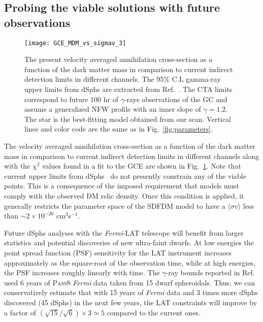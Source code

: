 \subsection{Probing the viable solutions with future observations}
\begin{figure}[t]
\begin{center}
\texttt{[image: GCE\_MDM\_vs\_sigmav\_3]} 
\caption{The present velocity averaged annihilation cross-section as a function of the dark matter mass in comparison to current indirect detection limits in different channels. 
The 95\% C.L gamma-ray upper limits from dSphs are extracted from Ref.~\cite{Ackermann:2015zua}. The CTA limits correspond to future 100 hr of $\gamma$-rays observations of the GC and assume a generalized NFW profile with an inner slope of $\gamma=1.2$.
The star is the best-fitting model obtained from our scan. 
Vertical lines and color code are the same as in Fig.~\ref{fig:parameters}.}
\label{fig:sigmav}
\end{center}
\end{figure}
The velocity averaged annihilation cross-section as a function of the dark matter mass in
comparison to current indirect detection limits in different channels along with the $\chi^2$ values found in a fit to the GCE are shown in Fig.~\ref{fig:sigmav}. 
Note that current upper limits from dSphs~\cite{Ackermann:2015zua} do not presently constrain any of the viable points. This is a consequence of the imposed requirement that models must comply with the observed DM relic density. Once this condition is applied, it generally restricts the parameter space of the SDFDM model to have a $\langle\sigma v\rangle$ less than $\sim 2\times 10^{-26}$ cm$^3$s$^{-1}$.

Future dSphs analyses with the \textit{Fermi}-LAT telescope will benefit from larger statistics and potential discoveries of new ultra-faint dwarfs. At low energies the point spread function (PSF) sensitivity for the LAT instrument increases approximately as the square-root of the observation time, while at high energies, the PSF increases roughly linearly with time. The $\gamma$-ray bounds reported in Ref.~\cite{Ackermann:2015zua} used 6 years of \textsc{Pass8} \textit{Fermi} data taken from 15 dwarf spheroidals. Thus, we can conservatively estimate that with 15 years of \textit{Fermi} data and 3 times more dSphs discovered (45 dSphs) in the next few years, the LAT constraints will improve by a factor of $(\sqrt{15}/\sqrt{6})\times 3 \simeq 5$ compared to the current ones. 

